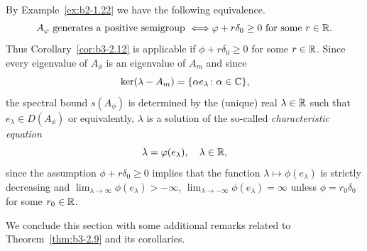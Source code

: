 \begin{example}
\begin{enumerate}[\upshape (i), wide, labelindent=.25em]
By Example~\ref{ex:b2-1.22} we have the following equivalence.
\begin{equation}\label{eq:b3-2.29}
	A_{\phi} \text{ generates a positive semigroup } \Longleftrightarrow \phi + r\delta_{0} \geq 0 \text{ for some } r \in \R.
\end{equation}
Thus Corollary~\ref{cor:b3-2.12} is applicable if\/ $\phi + r\delta_{0} \geq 0$ for some $r \in \mathbb{R}$.
Since every eigenvalue of\/ $A_{\phi}$ is an eigenvalue of\/ $A_{m}$ and since 
\[
\mathop{}\mathrm{ker}(\lambda-A_{m}) = \{\alpha e_{\lambda} \colon \alpha \in \mathbb{C}\} , 
\]
the spectral bound $s(A_{\phi})$ is determined by the (unique) real $\lambda \in \mathbb{R}$ such that $e_{\lambda} \in D(A_{\phi})$ or equivalently, $\lambda$ is a solution of the so-called \emph{characteristic equation}
\begin{equation}\label{eq:b3-2.30}
	\lambda = \phi(e_{\lambda}), \quad \lambda \in \R , 
\end{equation}
since the assumption $\phi + r\delta_{0} \geq 0$ implies that the function $\lambda \mapsto \phi(e_{\lambda})$ is strictly decreasing and $\lim_{\lambda \to \infty}\phi(e_{\lambda}) > -\infty$, $\lim_{\lambda \to -\infty}\phi(e_{\lambda}) = \infty$ unless $\phi = r_{0}\delta_{0}$ for some $r_{0} \in \mathbb{R}$.
\end{enumerate}
\end{example}
We conclude this section with some additional remarks related to Theorem~\ref{thm:b3-2.9} and its corollaries.
